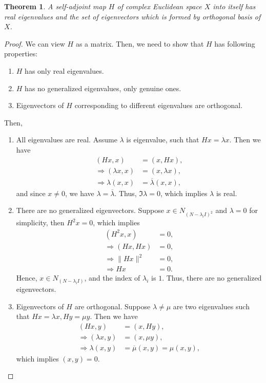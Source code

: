 \documentclass[10pt]{book}
\newtheorem{theorem}{Theorem}[chapter]
\theoremstyle{definition}
\numberwithin{equation}{chapter}
\begin{document}
\begin{theorem}\label{hermitian_eigenvalue_theorem}
A self-adjoint map $H$ of complex Euclidean space $X$ into itself has real eigenvalues and the set of eigenvectors which is formed by orthogonal basis of $X$.
\end{theorem}
\begin{proof}
We can view $H$ as a matrix. Then, we need to show that $H$ has following properties:
\begin{enumerate}[label=(\alph*)]
    \item $H$ has only real eigenvalues.
    
    \item $H$ has no generalized eigenvalues, only genuine ones.
    
    \item Eigenvectors of $H$ corresponding to different eigenvalues are orthogonal.
\end{enumerate}
Then, 
\begin{enumerate}[label=(\alph*)]
    \item All eigenvalues are real. Assume $\lambda$ is eigenvalue, such that $Hx = \lambda x$. Then we have
    \begin{align*}
        (Hx, x) & = (x, Hx), \\
        \Rightarrow (\lambda x, x) & = (x, \lambda x), \\
        \Rightarrow \lambda (x, x) & = \overline{\lambda} (x, x),
    \end{align*}
    and since $x \neq 0$, we have $\lambda = \overline{\lambda}$. Thus, $\Im \lambda = 0$, which implies $\lambda$ is real.
    \item There are no generalized eigenvectors. Suppose $x\in N_{(N - \lambda_i I)^2}$ and $\lambda = 0$ for simplicity, then $H^2 x = 0$, which implies
    \begin{align*}
        (H^2 x, x) & = 0, \\
        \Rightarrow (Hx, Hx) & = 0, \\
        \Rightarrow \|Hx\|^2 & = 0, \\
        \Rightarrow Hx & = 0.
    \end{align*}
    Hence, $x\in N_{(N - \lambda_i I)}$, and the index of $\lambda_i$ is $1$. Thus, there are no generalized eigenvectors.
    \item Eigenvectors of $H$ are orthogonal. Suppose $\lambda \neq \mu$ are two eigenvalues such that $Hx = \lambda x, Hy = \mu y$. Then we have
    \begin{align*}
        (Hx, y) & = (x, Hy), \\
        \Rightarrow (\lambda x, y) & = (x, \mu y), \\
        \Rightarrow \lambda(x, y) & = \overline{\mu} (x, y) = \mu (x, y),
    \end{align*}
    which implies $(x,y) = 0$. 
\end{enumerate}
\end{proof}
\end{document}
